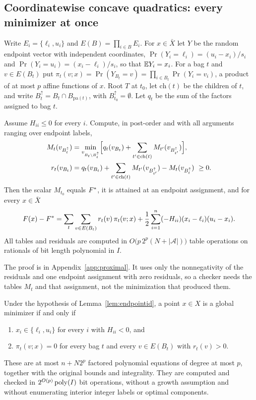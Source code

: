 \subsection{Coordinatewise concave quadratics: every minimizer at once}\label{sec:endpointset}

Write $E_i=\{\ell_i,u_i\}$ and $E(B)=\prod_{i\in B}E_i$. For $x\in\bar X$ let
$Y$ be the random endpoint vector with independent coordinates,
$\Pr(Y_i=\ell_i)=(u_i-x_i)/s_i$ and $\Pr(Y_i=u_i)=(x_i-\ell_i)/s_i$, so that
$\mathbb E Y_i=x_i$. For a bag $t$ and $v\in E(B_t)$ put
$\pi_t(v;x)=\Pr(Y_{B_t}=v)=\prod_{i\in B_t}\Pr(Y_i=v_i)$, a product of at
most $p$ affine functions of $x$. Root $T$ at $t_0$,
let $\mathrm{ch}(t)$ be the children of $t$, and write
$B_t^{\uparrow}=B_t\cap B_{\mathrm{pa}(t)}$, with $B_{t_0}^{\uparrow}=\emptyset$.
Let $q_t$ be the sum of the factors assigned to bag $t$.

\begin{lemma}\label{lem:endpointid}
Assume $H_{ii}\le0$ for every $i$. Compute, in post-order and with all
arguments ranging over endpoint labels,
\begin{align*}
M_t(v_{B_t^\uparrow})&=\min_{v_{B_t\setminus B_t^\uparrow}}
\Bigl[q_t(v_{B_t})+\sum_{t'\in\mathrm{ch}(t)}M_{t'}(v_{B_{t'}^\uparrow})\Bigr],\\
r_t(v_{B_t})&=q_t(v_{B_t})+\sum_{t'\in\mathrm{ch}(t)}M_{t'}(v_{B_{t'}^\uparrow})
-M_t(v_{B_t^\uparrow})\ \ge0 .
\end{align*}
Then the scalar $M_{t_0}$ equals $F^{*}$, it is attained at an endpoint
assignment, and for every $x\in\bar X$
\begin{equation}\label{eq:endpointid}
F(x)-F^{*}=\sum_{t}\sum_{v\in E(B_t)}r_t(v)\,\pi_t(v;x)
+\frac12\sum_{i=1}^n(-H_{ii})(x_i-\ell_i)(u_i-x_i).
\end{equation}
All tables and residuals are computed in
$O\bigl(p\,2^p(N+|\mathcal A|)\bigr)$ table operations on rationals of
bit length polynomial in $I$.
\end{lemma}

The proof is in Appendix~\ref{app:proximal}. It uses only the nonnegativity
of the residuals and one endpoint assignment with zero residuals, so a
checker needs the tables $M_t$ and that assignment, not the minimization that
produced them.

\begin{theorem}\label{thm:endpointset}
Under the hypothesis of Lemma~\ref{lem:endpointid}, a point $x\in X$ is a
global minimizer if and only if
\begin{enumerate}
\item[(a)] $x_i\in\{\ell_i,u_i\}$ for every $i$ with $H_{ii}<0$, and
\item[(b)] $\pi_t(v;x)=0$ for every bag $t$ and every $v\in E(B_t)$ with
$r_t(v)>0$.
\end{enumerate}
These are at most $n+N2^p$ factored polynomial equations of degree at most
$p$, together with the original bounds and integrality. They are computed and
checked in $2^{O(p)}\operatorname{poly}(I)$ bit operations, without a growth assumption and
without enumerating interior integer labels or optimal components.
\end{theorem}

